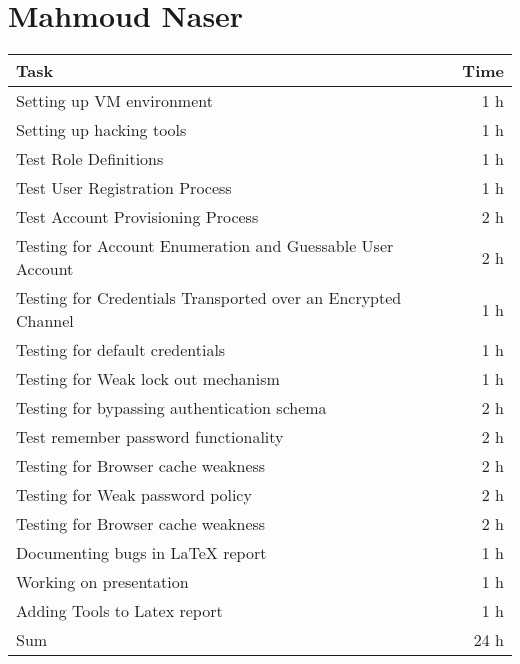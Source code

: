 \section*{Mahmoud Naser}
\begin{table}[h!tpb]
  \centering
  \begin{tabularx}{\textwidth}{X r}
    \toprule
      Task & Time \\
    \midrule
      Setting up VM environment & 1 h \\
      Setting up hacking tools & 1 h \\

      Test Role Definitions & 1 h \\
      Test User Registration Process & 1 h \\
      Test Account Provisioning Process & 2 h \\
      Testing for Account Enumeration and Guessable User Account & 2 h \\

      Testing for Credentials Transported over an Encrypted Channel & 1 h \\
      Testing for default credentials & 1 h \\
      Testing for Weak lock out mechanism & 1 h \\
      Testing for bypassing authentication schema & 2 h \\
      Test remember password functionality & 2 h \\
      Testing for Browser cache weakness & 2 h \\
      Testing for Weak password policy & 2 h \\
      Testing for Browser cache weakness & 2 h \\

      Documenting bugs in \LaTeX{} report & 1 h \\
      Working on presentation & 1 h \\
      Adding Tools to Latex report & 1 h \\
    \midrule
      Sum & 24 h \\
    \bottomrule
  \end{tabularx}
\end{table}

